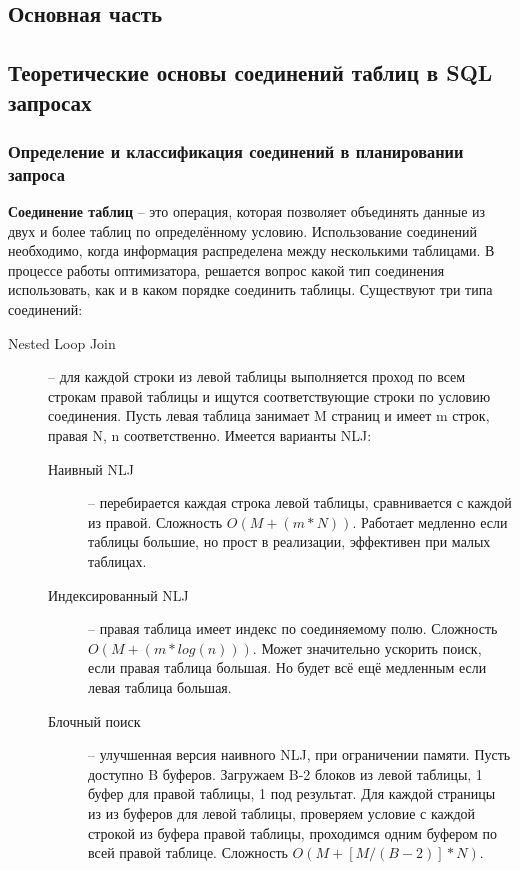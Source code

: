 \documentclass[12pt]{article}
\begin{document}
\begin{flushleft}
\centering \section*{Основная часть}
\centering \subsection*{Теоретические основы соединений таблиц в SQL запросах}
\centering \subsubsection*{Определение и классификация соединений в планировании запроса}
\raggedright
\textbf{Соединение таблиц} -- это операция, которая позволяет объединять данные
из двух и более таблиц по определённому условию. Использование соединений необходимо,
когда информация распределена между несколькими таблицами. В процессе работы оптимизатора,
решается вопрос какой тип соединения использовать, как и в каком порядке соединить таблицы. 
Существуют три типа соединений:
\begin{description}
    \item[Nested Loop Join] -- для каждой строки из левой таблицы выполняется проход по всем строкам 
    правой таблицы и ищутся соответствующие строки по условию соединения. Пусть левая таблица 
    занимает M страниц и имеет m строк, правая N, n соответственно. Имеется 
    варианты NLJ:
    \begin{description}
        \item[Наивный NLJ] -- перебирается каждая строка левой таблицы, 
        сравнивается с каждой из правой. Сложность $O(M+(m*N))$. Работает медленно 
        если таблицы большие, но прост в реализации, эффективен при малых 
        таблицах.
        \item[Индексированный NLJ] -- правая таблица имеет индекс по соединяемому 
        полю. Сложность $O(M+(m*log(n)))$. Может значительно ускорить поиск, если 
        правая таблица большая. Но будет всё ещё медленным если левая таблица 
        большая.
        \item[Блочный поиск] -- улучшенная версия наивного NLJ, при
        ограничении памяти. Пусть доступно B буферов. Загружаем B-2 
        блоков из левой таблицы, 1 буфер для правой таблицы, 1 под результат. 
        Для каждой страницы из из буферов для левой таблицы, проверяем условие 
        с каждой строкой из буфера правой таблицы, проходимся одним буфером по 
        всей правой таблице. Сложность $O(M + [M/(B-2)] * N)$.

\end{description}
\end{description}
\end{flushleft}
\end{document}
